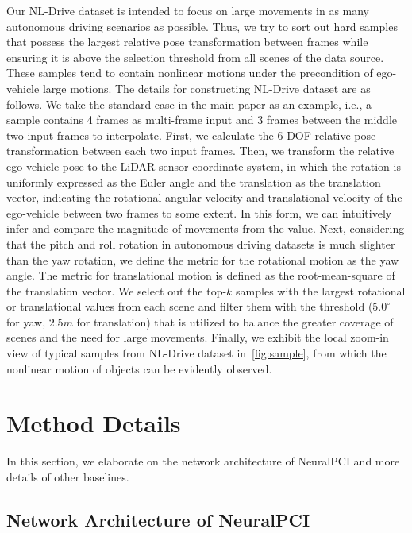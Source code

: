 \documentclass[10pt,twocolumn,letterpaper]{article}
\begin{document}
Our NL-Drive dataset is intended to focus on large movements in as many autonomous driving scenarios as possible. Thus, we try to sort out hard samples that possess the largest relative pose transformation between frames while ensuring it is above the selection threshold from all scenes of the data source. These samples tend to contain nonlinear motions under the precondition of ego-vehicle large motions. The details for constructing NL-Drive dataset are as follows. We take the standard case in the main paper as an example, i.e., a sample contains 4 frames as multi-frame input and 3 frames between the middle two input frames to interpolate. First, we calculate the 6-DOF relative pose transformation between each two input frames. Then, we transform the relative ego-vehicle pose to the LiDAR sensor coordinate system, in which the rotation is uniformly expressed as the Euler angle and the translation as the translation vector, indicating the rotational angular velocity and translational velocity of the ego-vehicle between two frames to some extent. In this form, we can intuitively infer and compare the magnitude of movements from the value. Next, considering that the pitch and roll rotation in autonomous driving datasets is much slighter than the yaw rotation, we define the metric for the rotational motion as the yaw angle. The metric for translational motion is defined as the root-mean-square of the translation vector. We select out the top-$\mathit{k}$ samples with the largest rotational or translational values from each scene and filter them with the threshold ($5.0^{\circ}$ for yaw, $2.5\mathit{m}$ for translation) that is utilized to balance the greater coverage of scenes and the need for large movements. Finally, we exhibit the local zoom-in view of typical samples from NL-Drive dataset in~\cref{fig:sample}, from which the nonlinear motion of objects can be evidently observed.





\section{Method Details}
\label{sec:appendix method details}

In this section, we elaborate on the network architecture of NeuralPCI and more details of other baselines. 

\subsection{Network Architecture of NeuralPCI}
\end{document}

